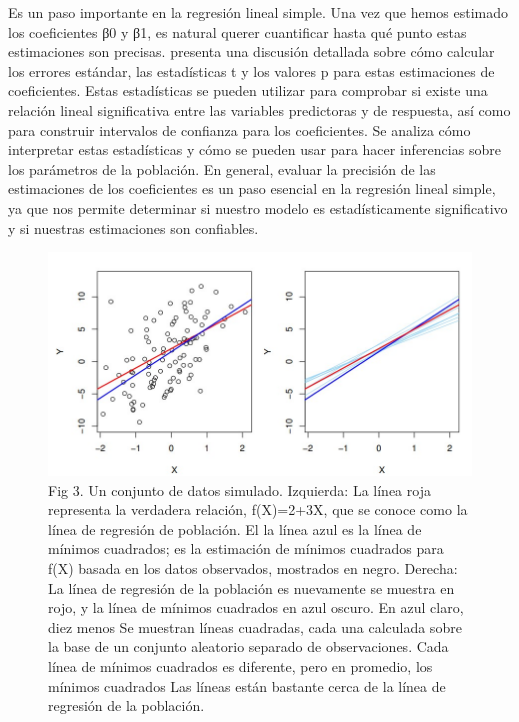 \documentclass[
  letterpaper,
  DIV=11,
  numbers=noendperiod]{scrartcl}
\begin{document}
Es un paso importante en la regresión lineal simple. Una vez que hemos
estimado los coeficientes β0 y β1, es natural querer cuantificar hasta
qué punto estas estimaciones son precisas. presenta una discusión
detallada sobre cómo calcular los errores estándar, las estadísticas t y
los valores p para estas estimaciones de coeficientes. Estas
estadísticas se pueden utilizar para comprobar si existe una relación
lineal significativa entre las variables predictoras y de respuesta, así
como para construir intervalos de confianza para los coeficientes. Se
analiza cómo interpretar estas estadísticas y cómo se pueden usar para
hacer inferencias sobre los parámetros de la población. En general,
evaluar la precisión de las estimaciones de los coeficientes es un paso
esencial en la regresión lineal simple, ya que nos permite determinar si
nuestro modelo es estadísticamente significativo y si nuestras
estimaciones son confiables.

\begin{figure}

{\centering \includegraphics{images/fig4.jpg}

}

\caption{Fig 3. Un conjunto de datos simulado. Izquierda: La línea roja
representa la verdadera relación, f(X)=2+3X, que se conoce como la línea
de regresión de población. El la línea azul es la línea de mínimos
cuadrados; es la estimación de mínimos cuadrados para f(X) basada en los
datos observados, mostrados en negro. Derecha: La línea de regresión de
la población es nuevamente se muestra en rojo, y la línea de mínimos
cuadrados en azul oscuro. En azul claro, diez menos Se muestran líneas
cuadradas, cada una calculada sobre la base de un conjunto aleatorio
separado de observaciones. Cada línea de mínimos cuadrados es diferente,
pero en promedio, los mínimos cuadrados Las líneas están bastante cerca
de la línea de regresión de la población.}

\end{figure}
\end{document}
